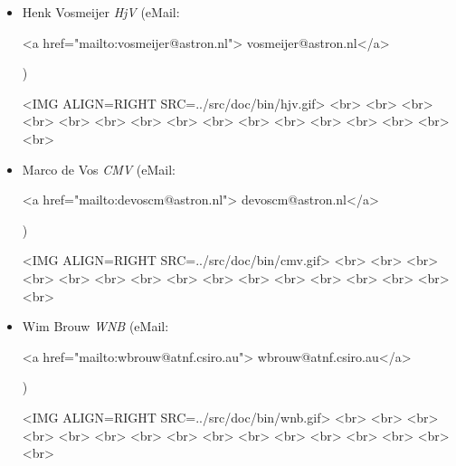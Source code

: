 \begin{itemize}
\item   Henk Vosmeijer                          \label{hjv} {\it HjV}
	(eMail:
	\begin{rawhtml}
		<a href="mailto:vosmeijer@astron.nl"> vosmeijer@astron.nl</a>
	\end{rawhtml}
	)
	\begin{rawhtml}
		<IMG ALIGN=RIGHT SRC=../src/doc/bin/hjv.gif>
 		<br>
		<br>
		<br>
		<br>
		<br>
		<br>
		<br>
		<br>
		<br>
		<br>
		<br>
		<br>
		<br>
		<br>
		<br>
		<br>
	\end{rawhtml}

\item   Marco de Vos                            \label{cmv} {\it CMV}
	(eMail:
	\begin{rawhtml}
		<a href="mailto:devoscm@astron.nl"> devoscm@astron.nl</a>
	\end{rawhtml}
	)
	\begin{rawhtml}
		<IMG ALIGN=RIGHT SRC=../src/doc/bin/cmv.gif>
 		<br>
		<br>
		<br>
		<br>
		<br>
		<br>
		<br>
		<br>
		<br>
		<br>
		<br>
		<br>
		<br>
		<br>
		<br>
		<br>
	\end{rawhtml}

\item   Wim Brouw                               \label{wnb} {\it WNB}
	(eMail:
	\begin{rawhtml}
		<a href="mailto:wbrouw@atnf.csiro.au"> wbrouw@atnf.csiro.au</a>
	\end{rawhtml}
	)
	\begin{rawhtml}
		<IMG ALIGN=RIGHT SRC=../src/doc/bin/wnb.gif>
 		<br>
		<br>
		<br>
		<br>
		<br>
		<br>
		<br>
		<br>
		<br>
		<br>
		<br>
		<br>
		<br>
		<br>
		<br>
		<br>
	\end{rawhtml}

\end{itemize}
